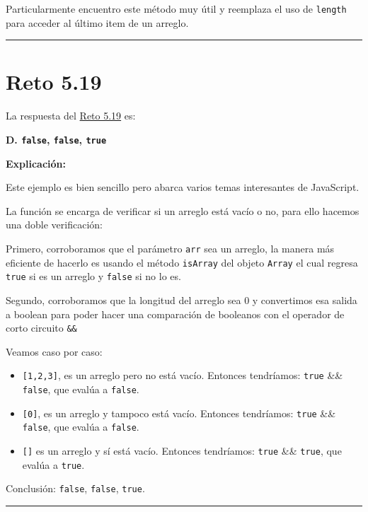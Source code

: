 \documentclass[
  letterpaper,
  DIV=11,
  numbers=noendperiod]{scrreprt}
\begin{document}
Particularmente encuentro este método muy útil y reemplaza el uso de
\texttt{length} para acceder al último item de un arreglo.

\begin{center}\rule{0.5\linewidth}{0.5pt}\end{center}

\section{Reto 5.19}\label{sec-sol-cap5-reto19}

La respuesta del \hyperref[sec-cap5-reto19]{Reto 5.19} es:

\textbf{D. \texttt{false}, \texttt{false}, \texttt{true}}

\textbf{Explicación:}

Este ejemplo es bien sencillo pero abarca varios temas interesantes de
JavaScript.

La función se encarga de verificar si un arreglo está vacío o no, para
ello hacemos una doble verificación:

Primero, corroboramos que el parámetro \texttt{arr} sea un arreglo, la
manera más eficiente de hacerlo es usando el método \texttt{isArray} del
objeto \texttt{Array} el cual regresa \texttt{true} si es un arreglo y
\texttt{false} si no lo es.

Segundo, corroboramos que la longitud del arreglo sea 0 y convertimos
esa salida a boolean para poder hacer una comparación de booleanos con
el operador de corto circuito \texttt{\&\&}

Veamos caso por caso:

\begin{itemize}
\item
  \texttt{{[}1,2,3{]}}, es un arreglo pero no está vacío. Entonces
  tendríamos: \texttt{true} \&\& \texttt{false}, que evalúa a
  \texttt{false}.
\item
  \texttt{{[}0{]}}, es un arreglo y tampoco está vacío. Entonces
  tendríamos: \texttt{true} \&\& \texttt{false}, que evalúa a
  \texttt{false}.
\item
  \texttt{{[}{]}} es un arreglo y sí está vacío. Entonces tendríamos:
  \texttt{true} \&\& \texttt{true}, que evalúa a \texttt{true}.
\end{itemize}

Conclusión: \texttt{false}, \texttt{false}, \texttt{true}.

\begin{center}\rule{0.5\linewidth}{0.5pt}\end{center}
\end{document}

